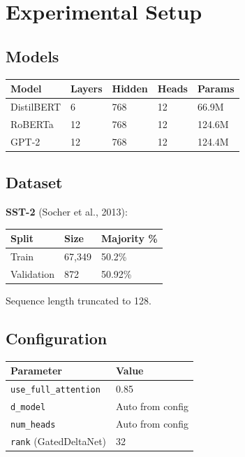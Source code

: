 
\section{Experimental Setup}

\subsection{Models}

\begin{table}[H]
\centering
\small
\begin{tabular}{lllll}
\toprule
\textbf{Model} & \textbf{Layers} & \textbf{Hidden} & \textbf{Heads} & \textbf{Params} \\
\midrule
DistilBERT & 6 & 768 & 12 & 66.9M \\
RoBERTa & 12 & 768 & 12 & 124.6M \\
GPT-2 & 12 & 768 & 12 & 124.4M \\
\bottomrule
\end{tabular}
\end{table}

\subsection{Dataset}

\textbf{SST-2} (Socher et al., 2013):

\begin{table}[H]
\centering
\small
\begin{tabular}{lll}
\toprule
\textbf{Split} & \textbf{Size} & \textbf{Majority \%} \\
\midrule
Train & 67,349 & 50.2\% \\
Validation & 872 & 50.92\% \\
\bottomrule
\end{tabular}
\end{table}

Sequence length truncated to 128.

\subsection{Configuration}

\begin{table}[H]
\centering
\small
\begin{tabular}{ll}
\toprule
\textbf{Parameter} & \textbf{Value} \\
\midrule
\texttt{use\_full\_attention} & 0.85 \\
\texttt{d\_model} & Auto from config \\
\texttt{num\_heads} & Auto from config \\
\texttt{rank} (GatedDeltaNet) & 32 \\
\bottomrule
\end{tabular}
\end{table}


